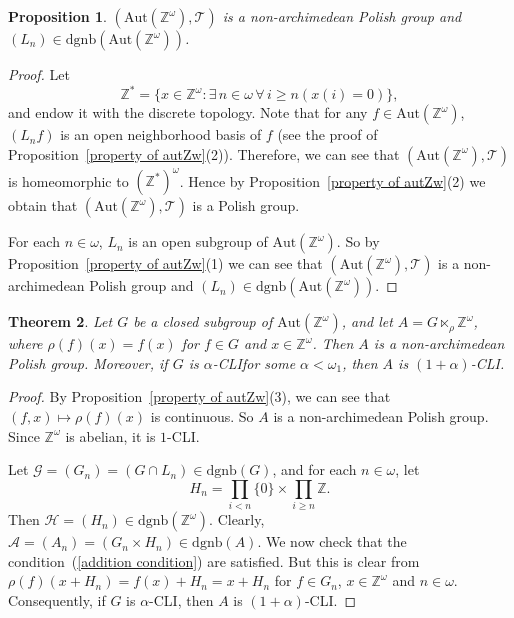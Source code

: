 \documentclass[11pt]{amsart}
\newtheorem{theorem}{Theorem}[section]
\newtheorem{proposition}[theorem]{Proposition}
\theoremstyle{definition}
\theoremstyle{remark}
\newtheorem{example}[theorem]{Example}
\numberwithin{equation}{section}
\def\Z {{\mathbb{Z}}}
\def\dgnb{{\mathrm{dgnb}}}
\def\hier#1{$#1$-CLI}
\def\aut{{\mathrm{Aut}}}
\def\dsZ{{\Z^*}}
\def\itx#1{{\mbox{\textrm{ #1 }}}}
\begin{document}
\begin{proposition}\label{autZomega is nonarchimedean Polish}
    $(\aut(\Z^\omega),\mathcal{T})$ is a non-archimedean Polish group and $(L_n)\in\dgnb(\aut(\Z^\omega))$.
\end{proposition}
\begin{proof}
    Let
    $$\dsZ=\{x\in\Z^\omega:\exists\,n\in\omega\,\forall\,i\geq n(x(i)=0)\},$$
    and endow it with the discrete topology. Note that for any $f\in\aut(\Z^\omega)$, $(L_nf)$ is an open neighborhood basis of $f$ (see the proof of Proposition~\ref{property of autZw}(2)). Therefore, we can see that $(\aut(\Z^\omega),\mathcal{T})$ is homeomorphic to $(\dsZ)^\omega$. Hence by Proposition~\ref{property of autZw}(2) we obtain that $(\aut(\Z^\omega),\mathcal{T})$ is a Polish group.

    For each $n\in\omega$, $L_n$ is an open subgroup of $\aut(\Z^\omega)$. So by Proposition~\ref{property of autZw}(1) we can see that $(\aut(\Z^\omega),\mathcal{T})$ is a non-archimedean Polish group and $(L_n)\in\dgnb(\aut(\Z^\omega))$.
\end{proof}

\begin{theorem}
    Let $G$ be a closed subgroup of $\aut(\Z^\omega)$, and let $A=G\ltimes_\rho\Z^\omega$, where $\rho(f)(x)=f(x)$ for $f\in G$ and $x\in\Z^\omega$. Then $A$ is a non-archimedean Polish group. Moreover, if $G$ is \hier\alpha\space for some $\alpha<\omega_1$, then $A$ is \hier{(1+\alpha)}.
\end{theorem}

\begin{proof}
    By Proposition~\ref{property of autZw}(3), we can see that $(f,x)\mapsto\rho(f)(x)$ is continuous. So $A$ is a non-archimedean Polish group. Since $\Z^\omega$ is abelian, it is \hier{1}.

    Let $\mathcal{G}=(G_n)=(G\cap L_n)\in\dgnb(G)$, and for each $n\in\omega$, let
    $$H_n=\prod_{i<n}\{0\}\times\prod_{i\geq n}\Z.$$
    Then $\mathcal{H}=(H_n)\in\dgnb(\Z^\omega)$. Clearly, $\mathcal{A}=(A_n)=(G_n\times H_n)\in\dgnb(A)$. We now check that the condition~(\ref{addition condition}) are satisfied. But this is clear from $\rho(f)(x+H_n)=f(x)+H_n=x+H_n$ for $f\in G_n$, $x\in\Z^\omega$ and $n\in\omega$. Consequently, if $G$ is \hier\alpha, then $A$ is \hier{(1+\alpha)}.
\end{proof}

\end{document}
